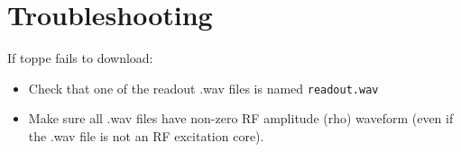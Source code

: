 
\chapter{Troubleshooting}

If toppe fails to download:
\begin{itemize}
	\item Check that one of the readout .wav files is named {\tt readout.wav}
	\item Make sure all .wav files have non-zero RF amplitude (rho) waveform (even if the .wav file is not an RF excitation core).
\end{itemize}
